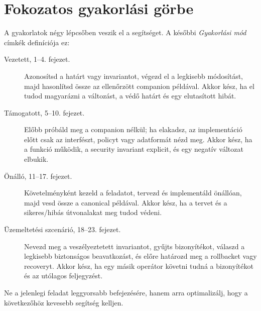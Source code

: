 \section*{Fokozatos gyakorlási görbe}
A gyakorlatok négy lépcsőben veszik el a segítséget. A későbbi \emph{Gyakorlási mód} címkék definíciója ez:

\begin{description}
  \item[Vezetett, 1--4. fejezet.] Azonosítsd a határt vagy invariantot, végezd el a legkisebb módosítást, majd hasonlítsd össze az ellenőrzött companion példával. Akkor kész, ha el tudod magyarázni a változást, a védő határt és egy elutasított hibát.
  \item[Támogatott, 5--10. fejezet.] Előbb próbáld meg a companion nélkül; ha elakadsz, az implementáció előtt csak az interfészt, policyt vagy adatformát nézd meg. Akkor kész, ha a funkció működik, a security invariant explicit, és egy negatív változat elbukik.
  \item[Önálló, 11--17. fejezet.] Követelményként kezeld a feladatot, tervezd és implementáld önállóan, majd vesd össze a canonical példával. Akkor kész, ha a tervet és a sikeres/hibás útvonalakat meg tudod védeni.
  \item[Üzemeltetési szcenárió, 18--23. fejezet.] Nevezd meg a veszélyeztetett invariantot, gyűjts bizonyítékot, válaszd a legkisebb biztonságos beavatkozást, és előre határozd meg a rollbacket vagy recoveryt. Akkor kész, ha egy másik operátor követni tudná a bizonyítékot és az utólagos feljegyzést.
\end{description}

Ne a jelenlegi feladat leggyorsabb befejezésére, hanem arra optimalizálj, hogy a következőhöz kevesebb segítség kelljen.
